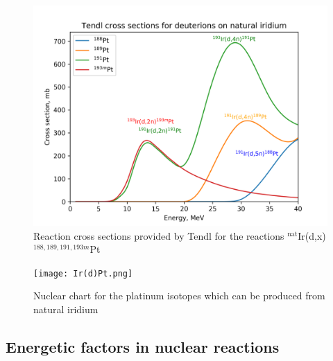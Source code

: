 \documentclass[a4paper,11pt,twoside]{book}
\begin{document}
\begin{figure}
    \centering
    \includegraphics{Theory/reactionchannels_pt.png}
    \caption{Reaction cross sections provided by Tendl for the reactions $^\text{nat}$Ir(d,x)$^{188,189,191,193m}$Pt}
    \label{fig:pt_reactionchannels}
\end{figure}

\begin{figure}
    \centering
    \texttt{[image: Ir(d)Pt.png]}
    \caption{Nuclear chart for the platinum isotopes which can be produced from natural iridium }
    \label{fig:chart_irpt}
\end{figure}



\subsection{Energetic factors in nuclear reactions}
\end{document}
